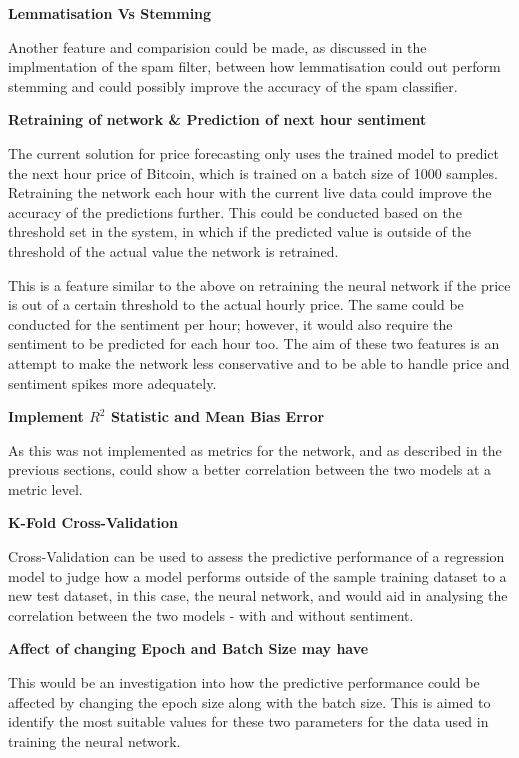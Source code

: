 \documentclass[oneside, 12pt]{article}
\begin{document}
		\textbf{Lemmatisation Vs Stemming}
		
		Another feature and comparision could be made, as discussed in the implmentation of the spam filter, between how lemmatisation could out perform stemming and could possibly improve the accuracy of the spam classifier.
		\newline
		
		\textbf{Retraining of network \& Prediction of next hour sentiment}
		
		The current solution for price forecasting only uses the trained model to predict the next hour price of Bitcoin, which is trained on a batch size of 1000 samples. Retraining the network each hour with the current live data could improve the accuracy of the predictions further. This could be conducted based on the threshold set in the system, in which if the predicted value is outside of the threshold of the actual value the network is retrained.
		
		This is a feature similar to the above on retraining the neural network if the price is out of a certain threshold to the actual hourly price. The same could be conducted for the sentiment per hour; however, it would also require the sentiment to be predicted for each hour too. The aim of these two features is an attempt to make the network less conservative and to be able to handle price and sentiment spikes more adequately.
		\newline
		
		\textbf{Implement $R^2$ Statistic and Mean Bias Error}
		
		As this was not implemented as metrics for the network, and as described in the previous sections, could show a better correlation between the two models at a metric level.
		\newline
		
		\textbf{K-Fold Cross-Validation}
		
		Cross-Validation can be used to assess the predictive performance of a regression model to judge how a model performs outside of the sample training dataset to a new test dataset, in this case, the neural network, and would aid in analysing the correlation between the two models - with and without sentiment.
		\newline
		
		\textbf{Affect of changing Epoch and Batch Size may have}
		
		This would be an investigation into how the predictive performance could be affected by changing the epoch size along with the batch size. This is aimed to identify the most suitable values for these two parameters for the data used in training the neural network.
		\newline
		
\end{document}
